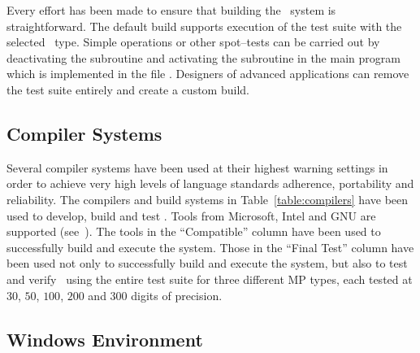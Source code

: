 
Every effort has been made to ensure that building
the \efloat\ system is straightforward.
The default build supports execution of the test suite
with the selected \efloatclass\ type.
Simple operations or other spot--tests can be carried out by deactivating
the subroutine
{}
and activating the subroutine
{}
in the {\courier main} program which is implemented in the
file {}.
Designers of advanced applications can remove the test suite entirely
and create a custom build.

\subsection{Compiler Systems}



Several compiler systems have been used at their highest warning settings
in order to achieve very high levels of language standards adherence,
portability and reliability.
The compilers and build systems in Table~\ref{table:compilers}
have been used to develop, build and test \efloat.
Tools from Microsoft{\footnotesize {\textregistered}}, Intel{\footnotesize {\textregistered}}
and GNU are supported
(see~\cite{microsoft:vs2008,microsoft:nmake,icc:website,gcc:website,gnumake:website}).
The tools in the ``Compatible'' column have been used
to successfully build and execute the system.
Those in the ``Final Test'' column have been used not only to
successfully build and execute the system, but also to test and
verify \efloat\ using the entire test suite
for three different MP types, each tested at
$30$, $50$, $100$, $200$ and $300$ digits of precision.

\pagebreak

\subsection{Windows{\footnotesize {\textregistered}} Environment}

